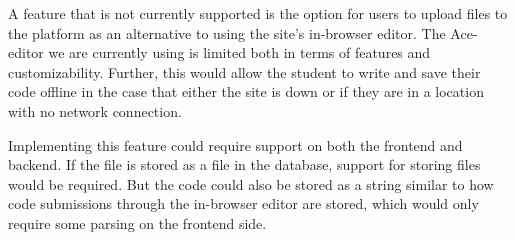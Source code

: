 A feature that is not currently supported is the option for users to upload files to the platform as an alternative to using the site's in-browser editor. The Ace-editor we are currently using is limited both in terms of features and customizability. Further, this would allow the student to write and save their code offline in the case that either the site is down or if they are in a location with no network connection.

Implementing this feature could require support on both the frontend and backend. If the file is stored as a file in the database, support for storing files would be required. But the code could also be stored as a string similar to how code submissions through the in-browser editor are stored, which would only require some parsing on the frontend side.